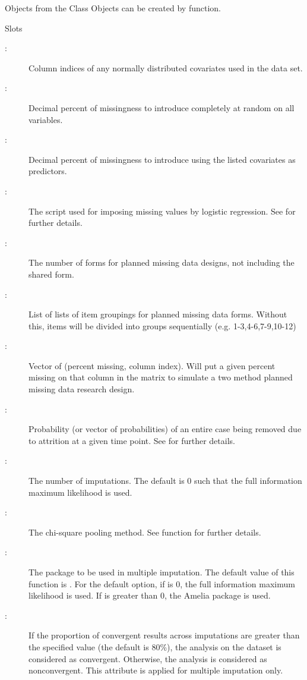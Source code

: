 \documentclass[a4paper]{book}
\begin{document}
%
\begin{Section}{Objects from the Class}
Objects can be created by  function. 
\end{Section}
%
\begin{Section}{Slots}
\begin{description}

\item[:] Column indices of any normally distributed covariates used in the data set.
\item[:] Decimal percent of missingness to introduce completely at random on all variables.
\item[:] Decimal percent of missingness to introduce using the listed covariates as predictors.
\item[:] The script used for imposing missing values by logistic regression. See  for further details.
\item[:] The number of forms for planned missing data designs, not including the shared form.
\item[:] List of lists of item groupings for planned missing data forms. Without this, items will be divided into groups sequentially (e.g. 1-3,4-6,7-9,10-12)
\item[:] Vector of (percent missing, column index). Will put a given percent
missing on that column in the matrix to simulate a two method
planned missing data research design. 
\item[:] Probability (or vector of probabilities) of an entire case being removed due to attrition at a given time point. See  for further details.
\item[:] The number of imputations. The default is 0 such that the full information maximum likelihood is used.
\item[:] The chi-square pooling method. See  function for further details.
\item[:] The package to be used in multiple imputation. The default value of this function is . For the default option, if  is 0, the full information maximum likelihood is used. If  is greater than 0, the Amelia package is used.
\item[:] If the proportion of convergent results across imputations are greater than the specified value (the default is 80\%), the analysis on the dataset is considered as convergent. Otherwise, the analysis is considered as nonconvergent. This attribute is applied for multiple imputation only.

\end{description}
\end{Section}
\end{document}
